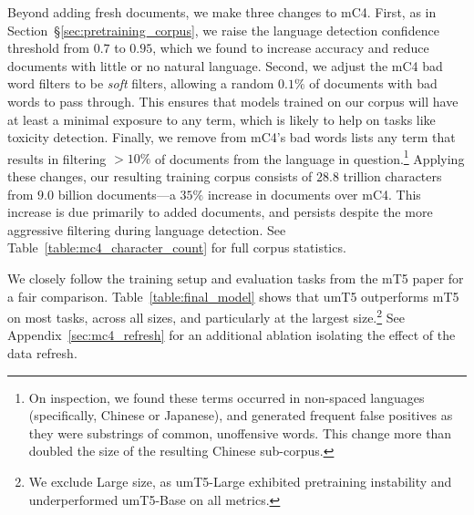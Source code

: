 \documentclass{article} %
\begin{document}
Beyond adding fresh documents, we make three changes to mC4\@.  First, as in Section~\S\ref{sec:pretraining_corpus}, we raise the language detection confidence threshold from $0.7$ to $0.95$, which we found to increase accuracy and reduce documents with little or no natural language.  Second, we adjust the mC4 bad word filters to be \emph{soft} filters, allowing a random $0.1\%$ of documents with bad words to pass through.  This ensures that models trained on our corpus will have at least a minimal exposure to any term, which is likely to help on tasks like toxicity detection. Finally, we remove from mC4's bad words lists any term that results in filtering ${>}10\%$ of documents from the language in question.\footnote{On inspection, we found these terms occurred in non-spaced languages (specifically, Chinese or Japanese), and generated frequent false positives as they were substrings of common, unoffensive words.  This change more than doubled the size of the resulting Chinese sub-corpus.} Applying these changes, our resulting training corpus consists of $28.8$ trillion characters from $9.0$ billion documents---a $35\%$ increase in documents over mC4.  This increase is due primarily to added documents, and persists despite the more aggressive filtering during language detection.  See Table~\ref{table:mc4_character_count} for full corpus statistics.

We closely follow the training setup and evaluation tasks from the mT5 paper for a fair comparison. Table~\ref{table:final_model} shows that umT5 outperforms mT5 on most tasks, across all sizes, and particularly at the largest size.\footnote{We exclude Large size, as umT5-Large exhibited pretraining instability and underperformed umT5-Base on all metrics.} See Appendix~\ref{sec:mc4_refresh} for an additional ablation isolating the effect of the data refresh.
\end{document}
